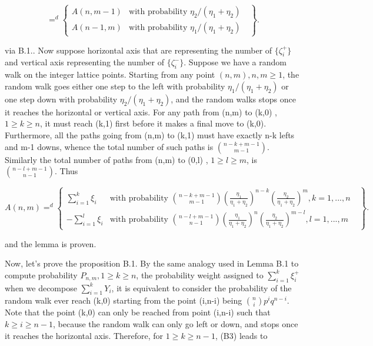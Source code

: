 \begin{equation*}
 =^{d}\left\{
\begin{array}{rl}
A(n,m-1) & \text{with probability $\eta_{2}/(\eta_{1}+\eta_{2})$ }\\
A(n-1,m) & \text{with probability $\eta_{1}/(\eta_{1}+\eta_{2})$ }
\end{array}\right\}.
\end{equation*}

via B.1.. Now suppose horizontal axis that are representing the number of $\{\zeta_{i}^{+}\}$ and vertical axis representing the number of $\{\zeta_{i}^{-}\}$. Suppose we have a random walk on the integer lattice points. Starting from any point $(n,m),n,m \geq 1$, the random walk goes either one step to the left with probability $\eta_{1}/(\eta_{1}+\eta_{2})$ or one step down with probability $\eta_{2}/(\eta_{1}+\eta_{2})$, and the random walks stops once it reaches the horizontal or vertical axis. For any path from (n,m) to (k,0) , $1 \geq k \geq n$, it must reach (k,1) first before it makes a final move to (k,0). Furthermore, all the paths going from (n,m) to (k,1) must have exactly n-k lefts and m-1 downs, whence the total number of such paths is $\binom {n-k+m-1}{m-1}$. Similarly the total number of paths from (n,m) to (0,l) , $1 \geq l \geq m$, is $\binom {n-l+m-1}{n-1}$. Thus

\begin{equation*}
A(n,m)=^{d}\left\{
\begin{array}{rl}
\sum_{i=1}^{k}\xi_{i} & \text{with probability $\binom {n-k+m-1} {m-1}(\frac{\eta_{1}}{\eta_{1}+\eta_{2}})^{n-k}(\frac{\eta_{2}}{\eta_{1}+\eta_{2}})^{m}, k=1,...,n$ }\\
-\sum_{i=1}^{l}\xi_{i} & \text{with probability $\binom {n-l+m-1} {n-1}(\frac{\eta_{1}}{\eta_{1}+\eta_{2}})^{n}(\frac{\eta_{2}}{\eta_{1}+\eta_{2}})^{m-l}, l=1,...,m$ }
\end{array}\right\}.
\end{equation*}

and the lemma is proven.

Now, let's prove the proposition B.1. By the same analogy used in Lemma B.1 to compute probability $P_{n,m},1\geq k \geq n$, the probability weight assigned to $\sum_{i=1}^{k}\xi_{i}^{+}$ when we decompose $\sum_{i=1}^{k}Y_{i}$, it is equivalent to consider the probability of the random walk ever reach (k,0) starting from the point (i,n-i) being $\binom {n}{i}p^{i}q^{n-i}$. Note that the point (k,0) can only be reached from point (i,n-i) such that $k \geq i \geq n-1$, because the random walk can only go left or down, and stops once it reaches the horizontal axis. Therefore, for $1 \geq k \geq n-1$, (B3) leads to

